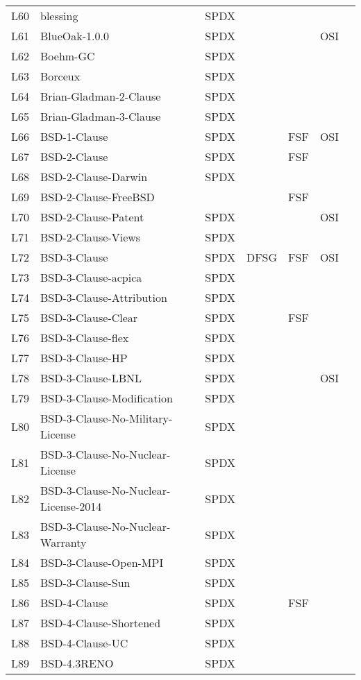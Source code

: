 \begin{longtable}[h]{m{2cm} | m{7cm} | c | c | c | c | c}
L60 & blessing & SPDX &  &  &  &  \\
L61 & BlueOak-1.0.0 & SPDX &  &  & OSI &  \\
L62 & Boehm-GC & SPDX &  &  &  &  \\
L63 & Borceux & SPDX &  &  &  &  \\
L64 & Brian-Gladman-2-Clause & SPDX &  &  &  &  \\
L65 & Brian-Gladman-3-Clause & SPDX &  &  &  &  \\
L66 & BSD-1-Clause & SPDX &  & FSF & OSI &  \\
L67 & BSD-2-Clause & SPDX &  & FSF &  &  \\
L68 & BSD-2-Clause-Darwin & SPDX &  &  &  &  \\
L69 & BSD-2-Clause-FreeBSD &  &  & FSF &  &  \\
L70 & BSD-2-Clause-Patent & SPDX &  &  & OSI &  \\
L71 & BSD-2-Clause-Views & SPDX &  &  &  &  \\
L72 & BSD-3-Clause & SPDX & DFSG & FSF & OSI &  \\
L73 & BSD-3-Clause-acpica & SPDX &  &  &  &  \\
L74 & BSD-3-Clause-Attribution & SPDX &  &  &  &  \\
L75 & BSD-3-Clause-Clear & SPDX &  & FSF &  &  \\
L76 & BSD-3-Clause-flex & SPDX &  &  &  &  \\
L77 & BSD-3-Clause-HP & SPDX &  &  &  &  \\
L78 & BSD-3-Clause-LBNL & SPDX &  &  & OSI &  \\
L79 & BSD-3-Clause-Modification & SPDX &  &  &  &  \\
L80 & BSD-3-Clause-No-Military-License & SPDX &  &  &  &  \\
L81 & BSD-3-Clause-No-Nuclear-License & SPDX &  &  &  &  \\
L82 & BSD-3-Clause-No-Nuclear-License-2014 & SPDX &  &  &  &  \\
L83 & BSD-3-Clause-No-Nuclear-Warranty & SPDX &  &  &  &  \\
L84 & BSD-3-Clause-Open-MPI & SPDX &  &  &  &  \\
L85 & BSD-3-Clause-Sun & SPDX &  &  &  &  \\
L86 & BSD-4-Clause & SPDX &  & FSF &  &  \\
L87 & BSD-4-Clause-Shortened & SPDX &  &  &  &  \\
L88 & BSD-4-Clause-UC & SPDX &  &  &  &  \\
L89 & BSD-4.3RENO & SPDX &  &  &  &  \\

\end{longtable}
